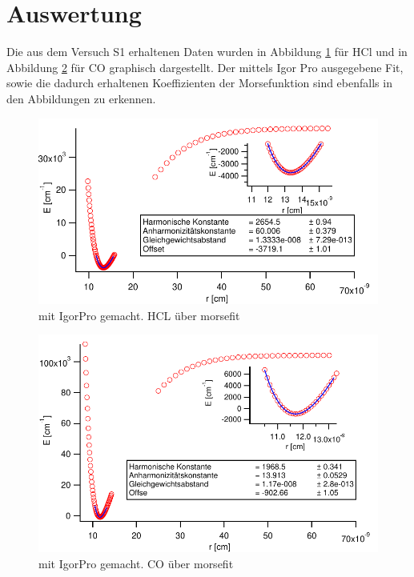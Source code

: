 \setlength\abovedisplayshortskip{20pt}
\setlength\belowdisplayshortskip{20pt}
\setlength\abovedisplayskip{20pt}
\setlength\belowdisplayskip{20pt}





\section{Auswertung}

Die aus dem Versuch S1 erhaltenen Daten wurden in Abbildung \ref{HCLplot} für HCl und in Abbildung \ref{COplot} für CO graphisch dargestellt. Der mittels Igor Pro ausgegebene Fit, sowie die dadurch erhaltenen Koeffizienten der Morsefunktion sind ebenfalls in den Abbildungen zu erkennen.
\begin{figure}[H]
	\centering	
	\begin{minipage}{1\textwidth}
	\includegraphics[width=\columnwidth]{Bilder/HCLGraph.pdf}
	\end{minipage}
	
	
	\caption{mit IgorPro gemacht. HCL über morsefit}
	

	\label{HCLplot}
\end{figure}
\begin{figure}[H]
	\centering	
	\begin{minipage}{1\textwidth}
	\includegraphics[width=\columnwidth]{Bilder/Graph2.pdf}
	\end{minipage}
	
	
	\caption{mit IgorPro gemacht. CO über morsefit}
	
	
	\label{COplot}
\end{figure}
